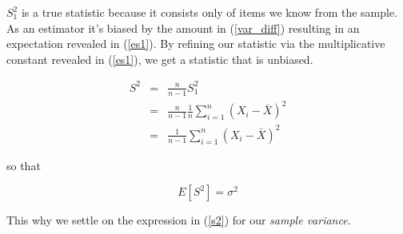 \documentclass[]{article}
\begin{document}
$S_1^2$ is a true statistic because it consists only of items we know
from the sample.  As an estimator it's biased by the amount in
(\ref{var_diff}) resulting in an expectation revealed in (\ref{es1}).
By refining our statistic via the multiplicative constant revealed in
(\ref{es1}), we get a statistic that is unbiased.

\begin{eqnarray}
S^2 &= & \frac{n}{n-1} S_1^2 \nonumber \\
    &= & \frac{n}{n-1} \frac{1}{n} \sum_{i=1}^n \left( X_i - \bar{X} \right)^2 \nonumber \\
    &= & \frac{1}{n-1} \sum_{i=1}^n \left( X_i - \bar{X} \right)^2 \label{s2}
\end{eqnarray}

so that

$$
E \left[S^2 \right] = \sigma^2
$$

This why we settle on the expression in (\ref{s2}) for our \emph{sample variance}.
\end{document}

